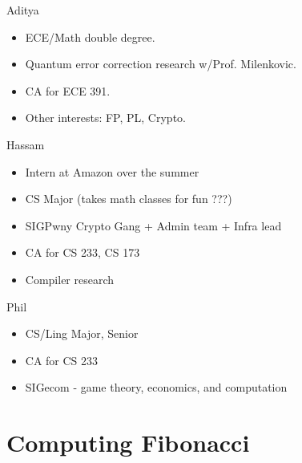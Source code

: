 \documentclass[aspectratio=169]{beamer}
\begin{document}
\begin{frame}{Aditya}
    \begin{itemize}
        \item ECE/Math double degree.
        \item Quantum error correction research w/Prof. Milenkovic.
        \item CA for ECE 391.
        \item Other interests: FP, PL, Crypto.
    \end{itemize} 
\end{frame}

\begin{frame}{Hassam}
    \begin{itemize}
        \item Intern at Amazon over the summer
        \item CS Major (takes math classes for fun ???)
        \item SIGPwny Crypto Gang + Admin team + Infra lead
        \item CA for CS 233, CS 173
        \item Compiler research
    \end{itemize}
\end{frame}

\begin{frame}{Phil}
    \begin{itemize}
        \item CS/Ling Major, Senior
        \item CA for CS 233
        \item SIGecom - game theory, economics, and computation
    \end{itemize}
\end{frame}

\section{Computing Fibonacci}
\frame{\sectionpage}
\end{document}

